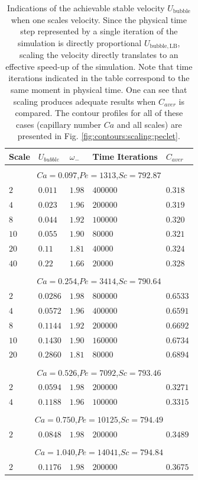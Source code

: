 \documentclass[review,12pt]{elsarticle}
\newcommand{\ububble}{U_{\mathrm{bubble}}}
\newcommand{\omegaminus}{\omega_{-}}
\begin{document}
\begin{table}[htb!]
\begin{tabularx}{\textwidth}{|X|X|X|X|X|}
\hline
Scale&$U_{bubble}$&$\omegaminus$&Time Iterations&$C_{aver}$\\
\hline
\multicolumn{5}{c}{}\\
\multicolumn{5}{c}{$Ca=0.097$,$Pe=1313$,$Sc=792.87$}\\
\hline
$2$ &$0.011$&$1.98$&$400000$&$0.318$\\
$4$ &$0.023$&$1.96$&$200000$&$0.319$\\
$8$ &$0.044$&$1.92$&$100000$&$0.320$\\
$10$&$0.055$&$1.90$&$80000$ &$0.321$\\
$20$&$0.11 $&$1.81$&$40000$ &$0.324$\\
$40$&$0.22 $&$1.66$&$20000$ &$0.328$\\
\hline
\multicolumn{5}{c}{}\\
\multicolumn{5}{c}{$Ca=0.254$,$Pe=3414$,$Sc=790.64$}\\
\hline
$2$& $0.0286$&$1.98$&$800000$&$0.6533$\\
$4$& $0.0572$&$1.96$&$400000$&$0.6591$\\
$8$& $0.1144$&$1.92$&$200000$&$0.6692$\\
$10$&$0.1430$&$1.90$&$160000$&$0.6734$\\
$20$&$0.2860$&$1.81$&$80000$ &$0.6894$\\
\hline
\multicolumn{5}{c}{}\\
\multicolumn{5}{c}{$Ca=0.526$,$Pe=7092$,$Sc=793.46$}\\
\hline
$2$&$0.0594$&$1.98$&$200000$&$0.3271$\\
$4$&$0.1188$&$1.96$&$100000$&$0.3315$\\
\hline
\multicolumn{5}{c}{}\\
\multicolumn{5}{c}{$Ca=0.750$,$Pe=10125$,$Sc=794.49$}\\
\hline
$2$&$0.0848$&$1.98$&$200000$&$0.3489$\\
\hline
\multicolumn{5}{c}{}\\
\multicolumn{5}{c}{$Ca=1.040$,$Pe=14041$,$Sc=794.84$}\\
\hline
$2$&$0.1176$&$1.98$&$200000$&$0.3675$\\
\hline
\end{tabularx}
\caption{Indications of the achievable stable velocity $\ububble$ when one scales velocity. Since
the physical time step represented by a single iteration of the simulation is directly proportional
$U_{\mathrm{bubble,LB}}$, scaling the velocity directly translates to an effective speed-up of the simulation.
Note that time iterations
indicated in the table correspond to the same moment in physical time. One can see that
scaling produces adequate results when $C_{aver}$ is compared.  
The contour
profiles for all of these cases (capillary number $Ca$ and all scales) are presented in Fig.
\ref{fig:contours:scaling:peclet}.
\label{table:scaling:peclet}}
\end{table}
\end{document}

